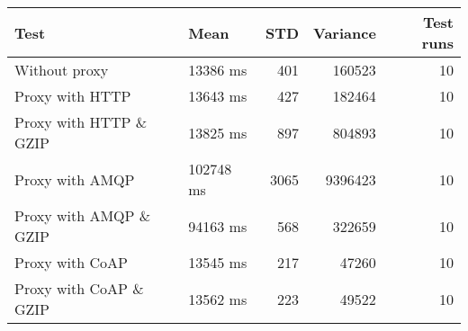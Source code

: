 \begin{tabularx}{\textwidth}{llrrr}
\hline
 Test                   & Mean      &   STD &   Variance &   Test runs \\
\hline
 Without proxy          & 13386 ms  &   401 &     160523 &          10 \\
 Proxy with HTTP        & 13643 ms  &   427 &     182464 &          10 \\
 Proxy with HTTP \& GZIP & 13825 ms  &   897 &     804893 &          10 \\
 Proxy with AMQP        & 102748 ms &  3065 &    9396423 &          10 \\
 Proxy with AMQP \& GZIP & 94163 ms  &   568 &     322659 &          10 \\
 Proxy with CoAP        & 13545 ms  &   217 &      47260 &          10 \\
 Proxy with CoAP \& GZIP & 13562 ms  &   223 &      49522 &          10 \\
\hline
\end{tabularx}